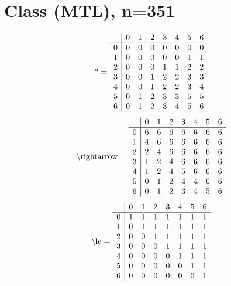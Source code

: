 \documentclass[11pt]{article}
\begin{document}
\section{Class (MTL), n=351}
\[\text{*} = 
\begin{array}{r | r r r r r r r}
 & 0 & 1 & 2 & 3 & 4 & 5 & 6 \\ \hline
0 & 0 & 0 & 0 & 0 & 0 & 0 & 0 \\
1 & 0 & 0 & 0 & 0 & 0 & 1 & 1 \\
2 & 0 & 0 & 0 & 1 & 1 & 2 & 2 \\
3 & 0 & 0 & 1 & 2 & 2 & 3 & 3 \\
4 & 0 & 0 & 1 & 2 & 2 & 3 & 4 \\
5 & 0 & 1 & 2 & 3 & 3 & 5 & 5 \\
6 & 0 & 1 & 2 & 3 & 4 & 5 & 6 \\
\end{array}
\]
\[\text{\textbackslash rightarrow} = 
\begin{array}{r | r r r r r r r}
 & 0 & 1 & 2 & 3 & 4 & 5 & 6 \\ \hline
0 & 6 & 6 & 6 & 6 & 6 & 6 & 6 \\
1 & 4 & 6 & 6 & 6 & 6 & 6 & 6 \\
2 & 2 & 4 & 6 & 6 & 6 & 6 & 6 \\
3 & 1 & 2 & 4 & 6 & 6 & 6 & 6 \\
4 & 1 & 2 & 4 & 5 & 6 & 6 & 6 \\
5 & 0 & 1 & 2 & 4 & 4 & 6 & 6 \\
6 & 0 & 1 & 2 & 3 & 4 & 5 & 6 \\
\end{array}
\]
\[\text{\textbackslash le} = 
\begin{array}{r | r r r r r r r}
 & 0 & 1 & 2 & 3 & 4 & 5 & 6 \\ \hline
0 & 1 & 1 & 1 & 1 & 1 & 1 & 1 \\
1 & 0 & 1 & 1 & 1 & 1 & 1 & 1 \\
2 & 0 & 0 & 1 & 1 & 1 & 1 & 1 \\
3 & 0 & 0 & 0 & 1 & 1 & 1 & 1 \\
4 & 0 & 0 & 0 & 0 & 1 & 1 & 1 \\
5 & 0 & 0 & 0 & 0 & 0 & 1 & 1 \\
6 & 0 & 0 & 0 & 0 & 0 & 0 & 1 \\
\end{array}
\]
\end{document}
